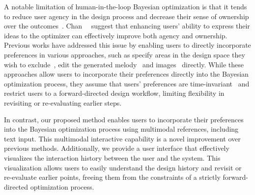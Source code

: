 A notable limitation of human-in-the-loop Bayesian optimization is that it tends to reduce user agency in the design process and decrease their sense of ownership over the outcomes~\cite{Chan2022}.
Chan~\etal~\cite{Chan2022} suggest that enhancing users' ability to express their ideas to the optimizer can effectively improve both agency and ownership.
Previous works have addressed this issue by enabling users to directly incorporate preferences in various approaches, such as specify areas in the design space they wish to exclude~\cite{Mo2024}, edit the generated melody~\cite{ZhouGenerativeMelody2020} and images~\cite{chong2021interactive} directly.
While these approaches allow users to incorporate their preferences directly into the Bayesian optimization process, they assume that users' preferences are time-invariant~\cite{KoyamaGallery2020} and restrict users to a forward-directed design workflow, limiting flexibility in revisiting or re-evaluating earlier steps.

In contrast, our proposed method enables users to incorporate their preferences into the Bayesian optimization process using multimodal references, including text input.
This multimodal interactive capability is a novel improvement over previous methods.
Additionally, we provide a user interface that effectively visualizes the interaction history between the user and the system. 
This visualization allows users to easily understand the design history and revisit or re-evaluate earlier points, freeing them from the constraints of a strictly forward-directed optimization process.